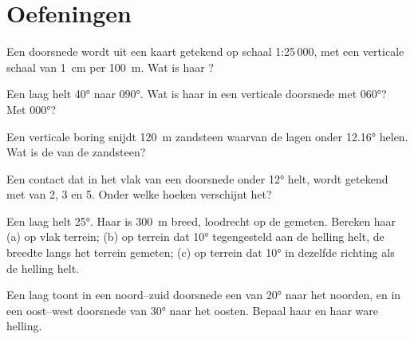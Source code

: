 \section{Oefeningen}

\begin{exercise}[$\star$]\label{exo:b1:cross-sections:1}
Een doorsnede wordt uit een kaart getekend op schaal 1:25\,000, met een verticale schaal van
\qty{1}{cm} per \qty{100}{m}. Wat is haar ?
\end{exercise}

\begin{exercise}[$\star$]\label{exo:b1:cross-sections:2}
Een laag helt \ang{40} naar \ang{090}. Wat is haar  in een verticale doorsnede met 
\ang{060}? Met  \ang{000}?
\end{exercise}

\begin{exercise}[$\star$]\label{exo:b1:cross-sections:3}
Een verticale boring snijdt \qty{120}{m} zandsteen waarvan de lagen onder \ang{12.16} helen. Wat is de  van de zandsteen?
\end{exercise}

\begin{exercise}[$\star$]\label{exo:b1:cross-sections:4}
Een contact dat in het vlak van een doorsnede onder \ang{12} helt, wordt getekend met 
van 2, 3 en 5. Onder welke hoeken verschijnt het?
\end{exercise}

\begin{exercise}[$\star\star$]\label{exo:b1:cross-sections:5}
Een laag helt \ang{25}. Haar  is \qty{300}{m} breed, loodrecht op de  gemeten. Bereken haar
 (a) op vlak terrein; (b) op terrein dat \ang{10} tegengesteld aan de helling helt, de breedte langs
het terrein gemeten; (c) op terrein dat \ang{10} in dezelfde richting als de helling helt.
\end{exercise}

\begin{exercise}[$\star\star$]\label{exo:b1:cross-sections:6}
Een laag toont in een noord--zuid doorsnede een  van \ang{20} naar het noorden, en in een
oost--west doorsnede van \ang{30} naar het oosten. Bepaal haar  en haar ware helling.
\end{exercise}

